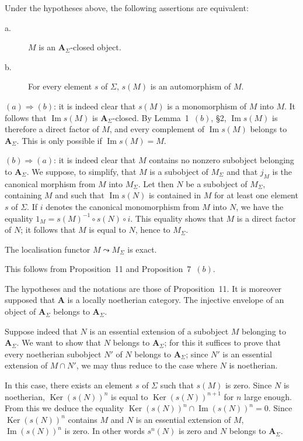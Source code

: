 \begin{proposition}
Under the hypotheses above, the following assertions are equivalent:
\begin{description}
\item[\normalfont a.] $M$ is an $\mathbf{A}_{\Sigma}$-closed object.
\item[\normalfont b.] For every element $s$ of $\Sigma$, $s(M)$ is an
automorphism of $M$.
\end{description}
\end{proposition}

$(a)\Rightarrow(b)$: it is indeed clear that $s(M)$ is a monomorphism of
$M$ into $M$. It follows that $\operatorname{Im}s(M)$ is
$\mathbf{A}_{\Sigma}$-closed. By Lemma~1~$(b)$, \S2,
$\operatorname{Im}s(M)$ is therefore a direct factor of $M$, and every
complement of $\operatorname{Im}s(M)$ belongs to $\mathbf{A}_{\Sigma}$.
This is only possible if $\operatorname{Im}s(M) = M$.

$(b)\Rightarrow(a)$: it is indeed clear that $M$ contains no nonzero
subobject belonging to $\mathbf{A}_{\Sigma}$. We suppose, to simplify,
that $M$ is a subobject of $M_{\Sigma}$ and that $j_M$ is the canonical
morphism from $M$ into $M_{\Sigma}$. Let then $N$ be a subobject of
$M_{\Sigma}$, containing $M$ and such that $\operatorname{Im}s(N)$ is
contained in $M$ for at least one element $s$ of $\Sigma$. If $i$ denotes
the canonical monomorphism from $M$ into $N$, we have the equality
$1_M = s(M)^{-1}\circ s(N)\circ i$. This equality shows that $M$ is a
direct factor of $N$; it follows that $M$ is equal to $N$, hence to
$M_{\Sigma}$.

\begin{unnumberedcorollary}
The localisation functor $M\leadsto M_{\Sigma}$ is exact.
\end{unnumberedcorollary}

This follows from Proposition~11 and Proposition~7~$(b)$.

\begin{proposition}
The hypotheses and the notations are those of Proposition~11. It is
moreover supposed that $\mathbf{A}$ is a locally noetherian category. The
injective envelope of an object of $\mathbf{A}_{\Sigma}$ belongs to
$\mathbf{A}_{\Sigma}$.
\end{proposition}

Suppose indeed that $N$ is an essential extension of a subobject $M$
belonging to $\mathbf{A}_{\Sigma}$. We want to show that $N$ belongs to
$\mathbf{A}_{\Sigma}$; for this it suffices to prove that every noetherian
subobject $N'$ of $N$ belongs to $\mathbf{A}_{\Sigma}$; since $N'$ is an
essential extension of $M\cap N'$, we may thus reduce to the case where
$N$ is noetherian.

In this case, there exists an element $s$ of $\Sigma$ such that $s(M)$ is
zero. Since $N$ is noetherian, $\operatorname{Ker}(s(N))^n$ is equal to
$\operatorname{Ker}(s(N))^{n+1}$ for $n$ large enough. From this we deduce
the equality
$\operatorname{Ker}(s(N))^n\cap\operatorname{Im}(s(N))^n = 0$. Since
$\operatorname{Ker}(s(N))^n$ contains $M$ and $N$ is an essential extension
of $M$, $\operatorname{Im}(s(N))^n$ is zero. In other words $s^n(N)$ is
zero and $N$ belongs to $\mathbf{A}_{\Sigma}$.
